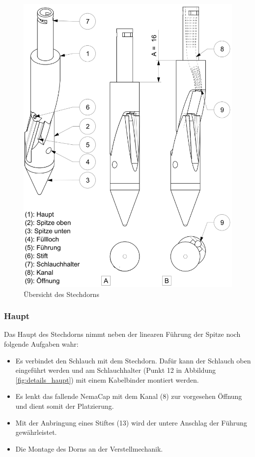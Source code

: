 	\begin{figure}[H]
	\includegraphics[scale=1.0]{Illustrationen/6-Umsetzung/details_stechdorn.jpg}
	\caption{Übersicht des Stechdorns}
	\label{fig:details_stechdorn}
	\end{figure}
\subsubsection{Haupt}
Das Haupt des Stechdorns nimmt neben der linearen Führung der Spitze noch folgende Aufgaben wahr:
\begin{itemize}
	\item Es verbindet den Schlauch mit dem Stechdorn. Dafür kann der Schlauch oben eingeführt werden und am Schlauchhalter (Punkt 12 in Abbildung \ref{fig:details_haupt}) mit einem Kabelbinder montiert werden.
	
	\item Es lenkt das fallende NemaCap mit dem Kanal (8) zur vorgesehen Öffnung und dient somit der Platzierung.
	
	\item Mit der Anbringung eines Stiftes (13) wird der untere Anschlag der Führung gewährleistet. 
		
	\item Die Montage des Dorns an der Verstellmechanik.
\end{itemize}

